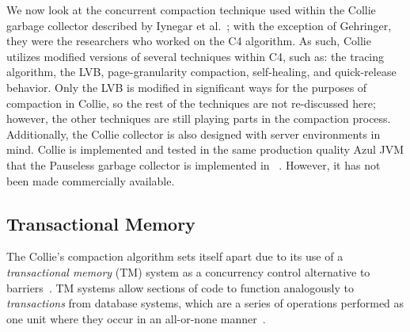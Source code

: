 \documentclass{sig-alternate}
\begin{document}

We now look at the concurrent compaction technique used within the 
Collie garbage collector described by Iynegar et al.~\cite{Iyengar:Collie};
with the exception of Gehringer, they were the researchers who worked on the C4 algorithm.
As such, Collie utilizes modified versions of several techniques within C4, such as:
the tracing algorithm, the LVB, page-granularity compaction, self-healing, and quick-release behavior.
Only the LVB is modified in significant ways for the purposes of compaction in Collie,
so the rest of the techniques are not re-discussed here; however, the other 
techniques are still playing parts in the compaction process. Additionally, the Collie
collector is also designed with server environments in mind. Collie is implemented and tested in 
the same production quality Azul JVM that the Pauseless garbage collector is implemented in
~\cite{Click:Pauseless}. However, it has not been made commercially available.


\subsection{Transactional Memory}
\label{sec:collieTM}

The Collie's compaction algorithm sets itself apart due to its use 
of a \emph{transactional memory} (TM) system as a concurrency control 
alternative to barriers~\cite{Iyengar:Collie}. TM systems allow
sections of code to function 
analogously to \emph{transactions} from database systems, 
which are a series of operations performed as one unit where 
they occur in an all-or-none manner~\cite{wiki:atomicity}.
\end{document}
